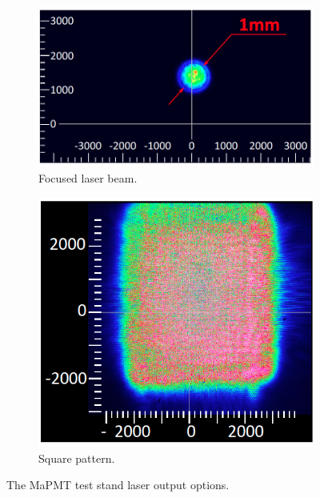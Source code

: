 \documentclass[5p,times,twocolumn]{elsarticle}
\begin{document}
\begin{figure}[bt]
	\centering
	\begin{subfigure}[b]{0.60\linewidth}
		\includegraphics[width=\textwidth]{beamspot2.png}
		\caption{Focused laser beam.}
		\label{fig:beamopt1}
	\end{subfigure}
	\begin{subfigure}[b]{0.38\linewidth}
		\includegraphics[width=\textwidth]{beamsquare2.png}
		\caption{Square pattern.}
		\label{fig:beamopt2}
	\end{subfigure}
	\caption{The MaPMT test stand laser output options.}
\end{figure}

\end{document}
